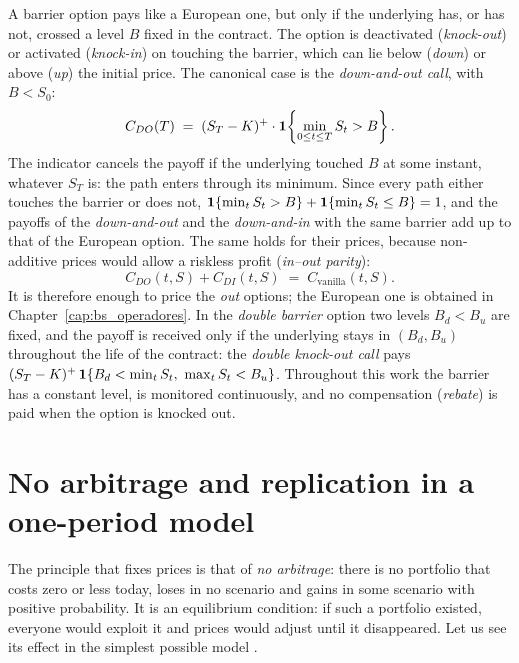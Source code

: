 A barrier option pays like a European one, but only if the underlying
has, or has not, crossed a level $B$ fixed in the contract. The option
is deactivated (\emph{knock-out}) or activated (\emph{knock-in}) on
touching the barrier, which can lie below (\emph{down}) or above
(\emph{up}) the initial price. The canonical case is the
\emph{down-and-out call}, with $B < S_0$:
\begin{equation}\label{eq:payoff_DO_call}
  C_{DO}(T) \;=\; (S_T - K)^+ \cdot
  \mathbf{1}\!\left\{\min_{0 \leq t \leq T} S_t > B\right\}.
\end{equation}
The indicator cancels the payoff if the underlying touched $B$ at some
instant, whatever $S_T$ is: the path enters through its minimum. Since
every path either touches the barrier or does not,
$\mathbf{1}\{\min_t S_t > B\} + \mathbf{1}\{\min_t S_t \leq B\} = 1$, and the payoffs of
the \emph{down-and-out} and the \emph{down-and-in} with the same barrier
add up to that of the European option. The same holds for their prices,
because non-additive prices would allow a riskless profit
(\emph{in--out parity}):
\begin{equation}\label{eq:paridad_in_out}
  C_{DO}(t, S) + C_{DI}(t, S) \;=\; C_{\text{vanilla}}(t, S).
\end{equation}
It is therefore enough to price the \emph{out} options; the European one
is obtained in Chapter~\ref{cap:bs_operadores}\enprep. In the
\emph{double barrier} option two levels $B_d < B_u$ are fixed, and the
payoff is received only if the underlying stays in $(B_d, B_u)$
throughout the life of the contract: the \emph{double knock-out call}
pays $(S_T - K)^+\, \1\{B_d < \min_t S_t,\ \max_t S_t < B_u\}$.
Throughout this work the barrier has a constant level, is monitored
continuously, and no compensation (\emph{rebate}) is paid when the
option is knocked out.

\section{No arbitrage and replication in a one-period model}\label{sec:no_arbitraje}

The principle that fixes prices is that of \emph{no arbitrage}: there
is no portfolio that costs zero or less today, loses in no scenario and
gains in some scenario with positive probability. It is an equilibrium
condition: if such a portfolio existed, everyone would exploit it and
prices would adjust until it disappeared. Let us see its effect in the
simplest possible model \cite[Section~2.2]{tfgm}.

